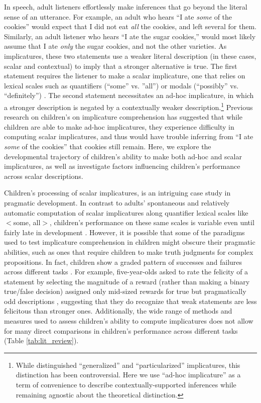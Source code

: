 \documentclass[man]{apa2}
\begin{document}
In speech, adult listeners effortlessly make inferences that go beyond the literal sense of an utterance. For example, an adult who hears ``I ate \emph{some} of the cookies'' would expect that I did not eat \emph{all} the cookies, and left several for them. Similarly, an adult listener who hears ``I ate the sugar cookies,'' would most likely assume that I ate \emph{only} the sugar cookies, and not the other varieties. As implicatures, these two statements use a weaker literal description (in these cases, scalar and contextual) to imply that a stronger alternative is true. The first statement requires the listener to make a scalar implicature, one that relies on lexical scales such as quantifiers (``some'' vs. ''all'') or modals (``possibly'' vs. ``definitely'') \cite{horn1972}. The second statement necessitates an ad-hoc implicature, in which a stronger description is negated by a contextually weaker description.\footnote{While  distinguished ``generalized'' and ``particularized'' implicatures, this distinction has been controversial. Here we use ``ad-hoc implicature'' as a term of convenience to describe contextually-supported inferences while remaining agnostic about the theoretical distinction.} Previous research on children's on implicature comprehension has suggested that while children are able to make ad-hoc implicatures, they experience difficulty in computing scalar implicatures, and thus would have trouble inferring from ``I ate \emph{some} of the cookies'' that cookies still remain. Here, we explore the developmental trajectory of children's ability to make both ad-hoc and scalar implicatures, as well as investigate factors influencing children's performance across scalar descriptions. 

Children's processing of scalar implicatures, is an intriguing case study in pragmatic development. In contrast to adults' spontaneous and relatively automatic computation of scalar implicatures along quantifier lexical scales like  $<${\sc some, all}$>$, children's performance on these same scales is variable even until fairly late in development \cite{noveck2001}. However, it is possible that some of the paradigms used to test implicature comprehension in children might obscure their pragmatic abilities, such as ones that require children to make truth judgments for complex propositions. In fact, children show a graded pattern of successes and failures across different tasks \cite{guasti2005,papafragou2003, papafragou2004}. For example, five-year-olds asked to rate the felicity of a statement by selecting the magnitude of a reward (rather than making a binary true/false decision) assigned only mid-sized rewards for true but pragmatically odd descriptions \cite{katsos2011}, suggesting that they do recognize that weak statements are less felicitous than stronger ones.  Additionally, the wide range of methods and measures used to assess children's ability to compute implicatures does not allow for many direct comparisons in children's performance across different tasks (Table \ref{tab:lit_review}).
\end{document}
